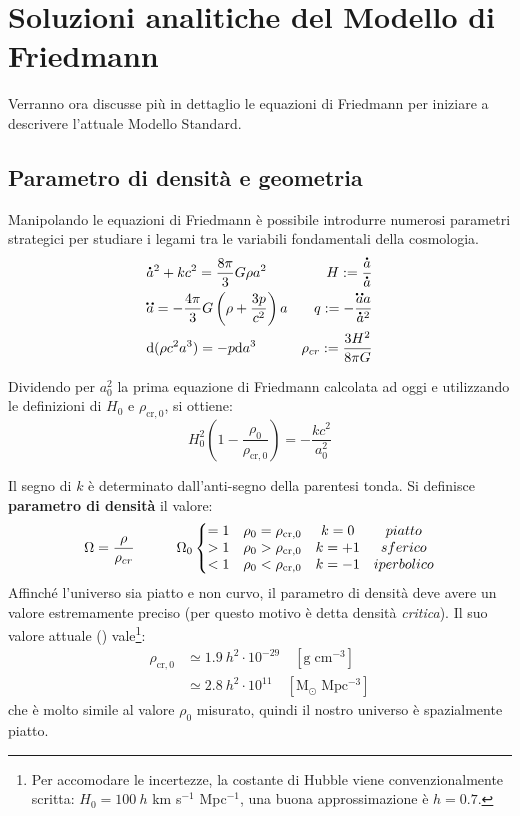 \newpage
\section{Soluzioni analitiche del Modello di Friedmann}
Verranno ora discusse più in dettaglio le equazioni di Friedmann per iniziare a descrivere l'attuale Modello Standard.
\subsection{Parametro di densità e geometria}
Manipolando le equazioni di Friedmann è possibile introdurre numerosi parametri strategici per studiare i legami tra le variabili fondamentali della cosmologia.
\begin{align*}
    & \accentset{\mbox{\large\bfseries .}}{a}^2+kc^2  =\frac{8\pi}{3}G{\rho} a^2 &  H:=\frac{\accentset{\mbox{\large\bfseries .}}{a}}{\accentset{\mbox{\large\bfseries .}}{a}} \\
    & \accentset{\mbox{\large\bfseries ..}}{a}  =-\frac{4\pi}{3}G\left ( {\rho}+\frac{3{p}}{c^2} \right )a   & q:= - \frac{\accentset{\mbox{\large\bfseries ..}}{a}a}{\accentset{\mbox{\large\bfseries .}}{a}^2} \\
   & \mathrm{d}(\rho c^2 a^3)= - p \mathrm{d}a^3 & \rho_{cr}:=\frac{3H^2}{8 \pi G}
\end{align*}

Dividendo per $a_0^2$ la prima equazione di Friedmann calcolata ad oggi e utilizzando le definizioni di $H_0$ e $\rho_{\mathrm{cr},0}$, si ottiene:
\begin{equation}
    H_0^2 \left ( 1-\frac{\rho_0}{\rho_{\mathrm{cr},0}}  \right ) = -\frac{kc^2}{a_0^2} \label{eq:friedmannh0rho0}
\end{equation}

Il segno di $k$ è determinato dall'anti-segno della parentesi tonda. Si definisce \textbf{parametro di densità} il valore:
\begin{equation}
    \Omega=\frac{\rho}{\rho_{cr}}\qquad\quad \Omega_0 \left\{\begin{matrix}
=1 & \rho_0=\rho_{\mathrm{cr},0} & k=0 & piatto\\ 
>1 & \rho_0>\rho_{\mathrm{cr},0} & k=+1 & sferico\\ 
<1 & \rho_0<\rho_{\mathrm{cr},0} & k=-1 & iperbolico
\end{matrix}\right.
\end{equation}
Affinché l'universo sia piatto e non curvo, il parametro di densità deve avere un valore estremamente preciso (per questo motivo è detta densità \textit{critica}).
Il suo valore attuale (\cite{collaboration2018planck}) vale\footnote{Per accomodare le incertezze, la costante di Hubble viene convenzionalmente scritta: $H_0 = 100\: h$ km s$^{-1}$ Mpc$^{-1}$, una buona approssimazione è $h=0.7$.}:
\begin{align}
    \rho_{\mathrm{cr},0} & \simeq 1.9\:h^2 \cdot 10^{-29}\quad [\mathrm{g\;cm^{-3}}] \\
    & \simeq 2.8\: h^2\cdot 10^{11}\quad [\mathrm{M_\odot\;Mpc^{-3}}]
\end{align}
che è molto simile al valore $\rho_0$ misurato, quindi il nostro universo è spazialmente piatto.

